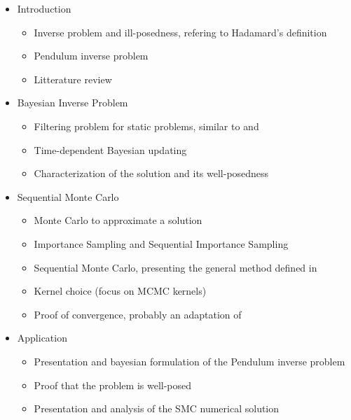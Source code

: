 \documentclass{article}
\begin{document}
\begin{itemize}
\item{Introduction}
  \begin{itemize}
  \item Inverse problem and ill-posedness, refering to Hadamard's definition \cite{hadamard}
  \item Pendulum inverse problem 
  \item Litterature review
  \end{itemize}
  
\item{Bayesian Inverse Problem}
  \begin{itemize}
  \item Filtering problem for static problems, similar to \cite{stuart_2010} and \cite{chopin_2002}
  \item Time-dependent Bayesian updating 
  \item Characterization of the solution and its well-posedness
  \end{itemize}

\item{Sequential Monte Carlo}
  \begin{itemize}
  \item Monte Carlo to approximate a solution
  \item Importance Sampling and Sequential Importance Sampling
  \item Sequential Monte Carlo, presenting the general method defined in \cite{del_moral_2006}
  \item Kernel choice (focus on MCMC kernels)
  \item Proof of convergence, probably an adaptation of \cite{beskos_2015}
  \end{itemize}

\item{Application}
  \begin{itemize}
  \item Presentation and bayesian formulation of the Pendulum inverse problem
  \item Proof that the problem is well-posed
  \item Presentation and analysis of the SMC numerical solution
  \end{itemize}
\end{itemize}



\end{document}
